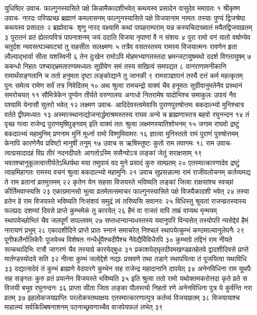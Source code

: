 युधिष्ठिर उवाच-
फाल्गुनस्यासिते पक्षे किन्नामैकादशीभवेत् 
कथयस्व प्रसादेन वासुदेव ममाग्रतः १
श्रीकृष्ण उवाच-
नारदः परिपप्रच्छ ब्रह्माणं कमलासनम् 
फाल्गुनस्यासिते पक्षे विजयानाम नामतः 
तस्याः पुण्यं द्विजश्रेष्ठ कथयस्व प्रसादतः २
ब्रह्मोवाच-
शृणु नारद वक्ष्यामि कथां पापहराम्पराम् 
यन्न कस्यचिदाख्यातं मयैतद्विजयाव्रतम् ३
पुरातनं व्रतं ह्येतत्पवित्रं पापनाशनम् 
जयं ददाति विजया नृपाणां वै न संशयः ४
पुरा रामो वनं यातो वर्षाण्येव चतुर्दश 
न्यवसत्पञ्चवट्यां तु  सहसीतः सलक्ष्मणः ५
तत्रैव वसतस्तस्य रामस्य विजयात्मनः 
रावणेन हृता लौल्याद्भार्या सीता यशस्विनी ६
तेन दुःखेन रामोऽपि मोहमभ्यागतस्तदा 
भ्रमन्जटायुषमथो ददर्श विगतायुषम् ७
कबन्धो निहतः पश्चाद्भ्रमतारण्यमध्यतः 
सुग्रीवेण समं तस्य सखित्वं समपद्यत ८
वानराणामनीकानि रामार्थंसङ्गतानि च 
ततो हनुमता दृष्टा लङ्कोद्याने तु जानकी ९
रामसञ्ज्ञापनं तस्यै दत्तं कर्म महत्कृतम् 
पुनः समेत्य रामेण सर्वं तत्र निवेदितम् १०
अथ श्रुत्वा रामचन्द्रो वाक्यं चैव हनूमतः 
सुग्रीवानुमतेनैव प्रस्थानं समरोचयत् ११
सौमित्रेकेन पुण्येन तीर्यते वरुणालयः 
अगाधो नितरामेष यादोभिश्च समाकुलः 
उपायं नैव पश्यामि येनासौ सुतरो भवेत् १२
लक्ष्मण उवाच-
आदिदेवस्त्वमेवासि पुराणपुरुषोत्तमः 
बकदाल्भ्यो मुनिश्चात्र वर्तते द्वीपमध्यतः १३
अस्मात्स्थानाद्योजनार्द्धमाश्रमस्तस्य राघव 
अन्ये च ब्राह्मणास्तत्र बहवो रघुनन्दन १४
तं पृच्छ गत्वा राजेन्द्र पुराणमृषिपुङ्गवम् 
इति वाक्यं ततः श्रुत्वा लक्ष्मणस्यातिशोभनम् १५
जगाम राघवो द्रष्टुं बकदाल्भ्यं महामुनिम् 
प्रणनाम मुनिं मूर्ध्ना रामो विष्णुमिवामरः १६
ज्ञात्वा मुनिस्ततो रामं पुराणं पुरुषोत्तमम् 
केनापि कारणेनैव प्रविष्टो मानुषीं तनुम् १७
उवाच स ऋषिस्तुष्टः कुतो राम तवागमः १८
राम उवाच-
त्वत्प्रसादादहं विप्र तीरं नदनदीपतेः 
आगतोऽस्मि ससैन्योऽत्र लङ्कां जेतुं सराक्षसाम् १९
भवतश्चानुकूलत्वात्तीर्यतेऽब्धिर्यथा मया 
तमुपायं वद मुने प्रसादं कुरु साम्प्रतम् २०
एतस्मात्कारणादेव द्रष्टुं त्वाहमिहागतः 
रामस्य वचनं श्रुत्वा बकदाल्भ्यो महामुनिः २१
उवाच सुप्रसन्नात्मा रामं राजीवलोचनम् 
कर्तव्यमद्य ते राम व्रतानां व्रतमुत्तमम् २२
कृतेन येन सहसा विजयस्ते भविष्यति 
लङ्कां जित्वा राक्षसांश्च स्वच्छां कीर्तिमवाप्स्यसि २३
एकाग्रमानसो भूत्वा व्रतमेतत्समाचर 
फाल्गुनस्यासिते पक्षे विजयैकादशी भवेत् २४
तस्या व्रतेन हे राम विजयस्ते भविष्यति 
निःसंशयं समुद्रं त्वं तरिष्यसि सवानरः २५
विधिस्तु श्रूयतां राजन्व्रतस्यास्य फलप्रदः 
दशम्यां दिवसे प्राप्ते कुम्भमेकं तु कारयेत् २६
हैमं वा राजतं वापि ताम्रं वाप्यथ मृन्मयम् 
स्थापयेच्छोभितं चैव जलपूर्णं सपल्लवम् २७
सप्तधान्यान्यधस्तस्य यवानुपरि विन्यसेत् 
तस्योपरि न्यसेद्देवं हैमं नारायणं प्रभुम् २८
एकादशीदिने प्राप्ते प्रातः स्नानं समाचरेत् 
निश्चलं स्थापयेत्कुम्भं कण्ठमाल्यानुलेपनैः २९
पूगीफलैर्नालिकेरैः पूजयेच्च विशेषतः 
गन्धैर्धूपैश्चदीपैश्च नैवेद्यैर्विविधैरपि ३०
कुम्भाग्रे तद्दिनं राम नीयते सत्कथादिभिः 
रात्रौ जागरणं चैव तस्याग्रे कारयेद्बुधः ३१
प्रकाशयेद्घृतदीपमखण्डव्रतहेतवे 
द्वादशीदिवसे प्राप्ते मार्तण्डस्योदये सति ३२
नीत्वा कुम्भं जलोद्देशे नद्याः प्रस्रवणे तथा 
तडागे स्थापयित्वा तं पूजयित्वा यथाविधि ३३
दद्यात्सदेवं तं कुम्भं ब्राह्मणे वेदपारगे 
कुम्भेन सह राजेन्द्र महादानानि दापयेत् ३४
अनेनविधिना राम यूथपैः सह सङ्गतः 
कुरु व्रतं प्रयत्नेन विजयस्ते भविष्यति ३५
इति श्रुत्वा ततो रामो यथोक्तमकरोत्तदा 
कृते व्रते स विजयी बभूव रघुनन्दनः ३६
प्राप्ता सीता जिता लङ्का पौलस्त्यो निहतो रणे 
अनेनविधिना पुत्र ये कुर्वन्ति नरा व्रतम् ३७
इहलोकजयप्राप्तिः परलोकस्तथाक्षयः 
एतस्मात्कारणात्पुत्र कर्तव्यं विजयाव्रतम् ३८
विजयायाश्च माहात्म्यं सर्वकिल्बिषनाशनम् 
पठनाच्छ्रवणाच्चैव वाजपेयफलं लभेत् ३९

